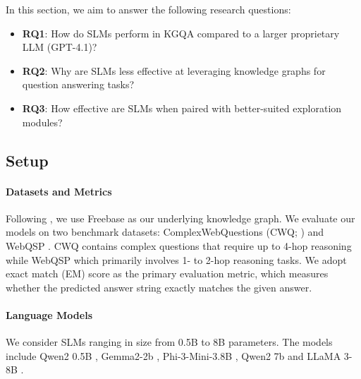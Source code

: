 \documentclass[11pt]{article}
\begin{document}
In this section, we aim to answer the following research questions:
\begin{itemize}
    \item \textbf{RQ1}: How do SLMs perform in KGQA compared to a larger proprietary LLM (GPT-4.1)?
    \item \textbf{RQ2}: Why are SLMs less effective at leveraging knowledge graphs for question answering tasks?
    \item \textbf{RQ3}: How effective are SLMs when paired with better-suited exploration modules?
\end{itemize}
\subsection{Setup}

\paragraph{Datasets and Metrics}
Following \citet{sun2024thinkongraph}, we use Freebase \cite{bollacker2008freebase} as our underlying knowledge graph. We evaluate our models on two benchmark datasets: ComplexWebQuestions (CWQ; \citealp{talmor-berant-2018-web}) and WebQSP \cite{yih-etal-2016-value}. CWQ contains complex questions that require up to 4-hop reasoning while WebQSP which primarily involves 1- to 2-hop reasoning tasks. %
We adopt exact match (EM) score as the primary evaluation metric, which measures whether the predicted answer string exactly matches the given answer.

\paragraph{Language Models}
We consider SLMs ranging in size from 0.5B to 8B parameters. The models include Qwen2 0.5B \cite{yang2024qwen2}, Gemma2-2b \cite{gemma2024gemma}, Phi-3-Mini-3.8B \cite{abdin2024phi}, Qwen2 7b and LLaMA 3-8B \cite{grattafiori2024llama}.


\end{document}
